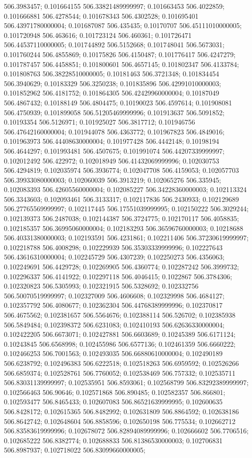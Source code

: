506.3983457; 0.101664155 506.33821489999997; 0.101663453 506.4022859; 0.101666881 506.4278544; 0.101678343 506.4302528; 0.101695401 506.43971780000004; 0.101687087 506.435435; 0.10170707 506.45111010000005; 0.101720948 506.463616; 0.101723124 506.460361; 0.101726471 506.44537110000005; 0.101744892 506.5152668; 0.101748041 506.5673031; 0.101760244 506.4855869; 0.10175826 506.4150487; 0.101776417 506.4247279; 0.101787457 506.4458851; 0.101800601 506.4657145; 0.101802347 506.4133784; 0.101808763 506.38228510000005; 0.10181463 506.3721348; 0.101834454 506.3940629; 0.10183329 506.3250238; 0.101835896 506.42991010000003; 0.101852962 506.4181752; 0.101864305 506.42429960000004; 0.10187049 506.4867432; 0.10188149 506.4804475; 0.10190023 506.4597614; 0.101908081 506.4750939; 0.101899058 506.51205469999996; 0.101913637 506.5091852; 0.10193354 506.5126971; 0.101925027 506.3817712; 0.101946756 506.47642160000004; 0.101944078 506.4363772; 0.101967823 506.4849016; 0.101963973 506.44408630000004; 0.101977428 506.4442148; 0.10198194 506.4644297; 0.101993481 506.4507675; 0.101991074 506.44207339999997; 0.102012492 506.422972; 0.102018949 506.41432069999996; 0.102030753 506.4294819; 0.102035974 506.3936774; 0.102047708 506.4159053; 0.102057703 506.39933080000003; 0.102060039 506.3913219; 0.102065276 506.335945; 0.102083393 506.42605560000004; 0.102085227 506.34228360000003; 0.102113324 506.3343603; 0.102093461 506.3133317; 0.102117836 506.2430933; 0.102129689 506.27765569999997; 0.102117445 506.17551039999995; 0.102150222 506.3029244; 0.102139373 506.2487038; 0.102144387 506.3724775; 0.102170117 506.4058835; 0.102185357 506.36995060000004; 0.102183293 506.36596760000003; 0.10218688 506.40331380000003; 0.102193591 506.4231861; 0.102211406 506.37230619999997; 0.102218788 506.4008298; 0.102229939 506.35303339999996; 0.102227643 506.43616310000004; 0.102245729 506.4307239; 0.102250273 506.4356063; 0.102249691 506.4429728; 0.102269905 506.4360774; 0.102287242 506.3999732; 0.102296337 506.4141922; 0.102297118 506.4046415; 0.1022867 506.3784306; 0.102320823 506.5305993; 0.102321915 506.5328692; 0.102332756 506.50070519999997; 0.102327009 506.4606608; 0.102329998 506.4684127; 0.102357792 506.4080677; 0.102362304 506.44768389999996; 0.102370817 506.4675562; 0.102381657 506.5564676; 0.102388114 506.526702; 0.102385938 506.5849484; 0.102398372 506.6231083; 0.102410193 506.62636330000004; 0.102422205 506.6673071; 0.102427881 506.6603689; 0.10245389 506.6171124; 0.10243845 506.6568998; 0.102455986 506.6577136; 0.102461359 506.6660222; 0.102466253 506.7001563; 0.102493035 506.66880610000004; 0.102490189 506.6238792; 0.102496383 506.6222518; 0.102518263 506.6959592; 0.102526266 506.6859374; 0.102528761 506.7760052; 0.102538469 506.757332; 0.102535711 506.83031139999997; 0.102535951 506.8593061; 0.102568799 506.83292389999997; 0.102566463 506.90646; 0.102571868 506.890485; 0.102582357 506.866801; 0.102593477 506.8465433; 0.102607083 506.86521639999995; 0.102600635 506.8428172; 0.102615365 506.8482992; 0.102631809 506.8864592; 0.102638186 506.8642742; 0.102648604 506.8858596; 0.102650198 506.775534; 0.102662712 506.83583619999996; 0.102678072 506.82894089999996; 0.102666602 506.7706516; 0.102685222 506.8382774; 0.102688833 506.81386530000003; 0.102706831 506.8987937; 0.102718022 506.83099660000005; 